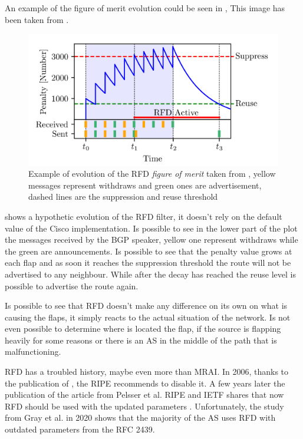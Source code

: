 An example of the figure of merit evolution could be seen in ,
This image has been taken from \cite{gray2020bgp}.

\begin{figure}[ht]
    \centering
    \includegraphics[scale=0.22]{images/RFD/evolution.png}
	\caption{Example of evolution of the \ac{RFD} \textit{figure of merit} taken
	from \cite{gray2020bgp}, yellow messages represent withdraws and green ones
	are advertisement, dashed lines are the suppression and reuse threshold}
    \label{fig:figure_of_merit}
\end{figure}

 shows a hypothetic evolution of the \ac{RFD} filter,
it doesn't rely on the default value of the Cisco implementation.
Is possible to see in the lower part of the plot the messages received by the
\ac{BGP} speaker, yellow one represent withdraws while the green are announcements.
Is possible to see that the penalty value grows at each flap and as soon it reaches
the suppression threshold the route will not be advertised to any neighbour.
While after the decay has reached the reuse level is possible to advertise the
route again.

Is possible to see that \ac{RFD} doesn't make any difference on its own on what
is causing the flaps, it simply reacts to the actual situation of the network.
Is not even possible to determine where is located the flap, if the source
is flapping heavily for some reasons or there is an \ac{AS} in the middle of the
path that is malfunctioning.

\ac{RFD} has a troubled history, maybe even more than \ac{MRAI}.
In \num{2006}, thanks to the publication of \cite{mao2002route}, the \ac{RIPE}
recommends to disable it\cite{smith2006ripe}.
A few years later the publication of the article from Pelsser et al. \cite{pelsser2011route}
\ac{RIPE} and \ac{IETF} shares that now \ac{RFD} should be used with the updated
parameters \cite{bush2013ripe,rfc7196}.
Unfortunately, the study from Gray et al. \cite{gray2020bgp} in \num{2020} shows
that the majority of the \ac{AS} uses \ac{RFD} with outdated parameters
from the \ac{RFC} \num{2439}.

